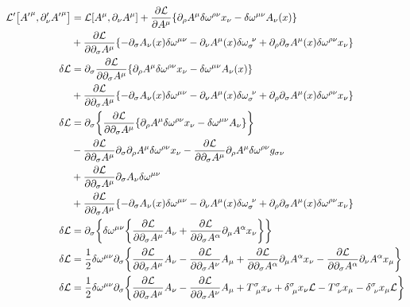 \documentclass[twoside]{amsart}
\numberwithin{equation}{section}
\begin{document}
\begin{align}
    \mathcal L'\qty[{A'}^\mu,\partial_\nu' {A'}^\mu]&=\mathcal L\qty[A^\mu,\partial_\nu A^\mu]+\pdv{\mathcal L}{A^\mu}\qty{\partial_\rho A^\mu\delta\omega^{\rho\nu}x_\nu-\delta\omega^{\mu\nu}A_\nu\qty(x)}\\
    &+\pdv{\mathcal L}{\partial_\sigma A^\mu}\qty{-\partial_\sigma A_\nu\qty(x)\delta\omega^{\mu\nu}-\partial_\nu A^\mu\qty(x)\delta\omega_{\sigma}^{\ \nu}+\partial_\rho\partial_\sigma A^\mu\qty(x)\delta\omega^{\rho\nu}x_\nu}\\
    \delta\mathcal L&=\partial_\sigma\pdv{\mathcal L}{\partial_\sigma A^\mu}\qty{\partial_\rho A^\mu\delta\omega^{\rho\nu}x_\nu-\delta\omega^{\mu\nu}A_\nu\qty(x)}\\
    &+\pdv{\mathcal L}{\partial_\sigma A^\mu}\qty{-\partial_\sigma A_\nu\qty(x)\delta\omega^{\mu\nu}-\partial_\nu A^\mu\qty(x)\delta\omega_{\sigma}^{\ \nu}+\partial_\rho\partial_\sigma A^\mu\qty(x)\delta\omega^{\rho\nu}x_\nu}\\
    \delta\mathcal L&=\partial_\sigma\qty{\pdv{\mathcal L}{\partial_\sigma A^\mu}\qty{\partial_\rho A^\mu\delta\omega^{\rho\nu}x_\nu-\delta\omega^{\mu\nu}A_\nu}}\\
    &-\pdv{\mathcal L}{\partial_\sigma A^\mu}\partial_\sigma\partial_\rho A^\mu\delta\omega^{\rho\nu}x_\nu-\pdv{\mathcal L}{\partial_\sigma A^\mu}\partial_\rho A^\mu\delta\omega^{\rho\nu}g_{\sigma\nu}\\
    &+\pdv{\mathcal L}{\partial_\sigma A^\mu}\partial_\sigma A_\nu\delta\omega^{\mu\nu}\\
    &+\pdv{\mathcal L}{\partial_\sigma A^\mu}\qty{-\partial_\sigma A_\nu\qty(x)\delta\omega^{\mu\nu}-\partial_\nu A^\mu\qty(x)\delta\omega_{\sigma}^{\ \nu}+\partial_\rho\partial_\sigma A^\mu\qty(x)\delta\omega^{\rho\nu}x_\nu}\\
    \delta\mathcal L&=\partial_\sigma\qty{\delta\omega^{\mu\nu}\qty{\pdv{\mathcal L}{\partial_\sigma A^\mu}A_\nu+\pdv{\mathcal L}{\partial_\sigma A^\alpha}\partial_\mu A^\alpha x_\nu}}\\
    \delta\mathcal L&=\frac12\delta\omega^{\mu\nu}\partial_\sigma\qty{\pdv{\mathcal L}{\partial_\sigma A^\mu}A_\nu-\pdv{\mathcal L}{\partial_\sigma A^\nu}A_\mu+\pdv{\mathcal L}{\partial_\sigma A^\alpha}\partial_\mu A^\alpha x_\nu-\pdv{\mathcal L}{\partial_\sigma A^\alpha}\partial_\nu A^\alpha x_\mu}\\
    \delta\mathcal L&=\frac12\delta\omega^{\mu\nu}\partial_\sigma\qty{\pdv{\mathcal L}{\partial_\sigma A^\mu}A_\nu-\pdv{\mathcal L}{\partial_\sigma A^\nu}A_\mu+T^{\sigma}_{\ \mu}x_\nu+\delta^{\sigma}_{\ \mu}x_\nu\mathcal L-T^{\sigma}_{\ \nu}x_\mu-\delta^{\sigma}_{\ \nu}x_\mu\mathcal L}
\end{align}
\end{document}
